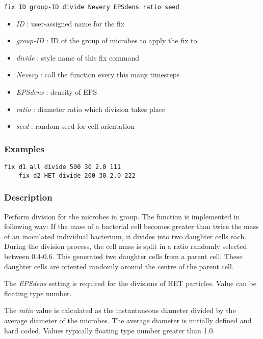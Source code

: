 \documentclass[11pt,a4paper,openright]{article}
\begin{document}
\begin{Verbatim}[frame=single]
	fix ID group-ID divide Nevery EPSdens ratio seed
\end{Verbatim}
	
\begin{itemize}
\item
	{\it ID }: user-assigned name for the fix
\item
	{\it group-ID }: ID of the group of microbes to apply the fix to
\item
	{\it divide }: style name of this fix command
\item
	{\it Nevery }: call the function every this many timesteps
\item
	{\it EPSdens }: density of EPS 
\item
	{\it ratio }: diameter ratio which division takes place
\item 
	{\it seed }: random seed for cell orientation
\end{itemize}

\subsubsection*{Examples}

\begin{Verbatim}[frame=single]
	fix d1 all divide 500 30 2.0 111
	fix d2 HET divide 200 30 2.0 222
\end{Verbatim}

\subsubsection*{Description}

Perform division for the microbes in group. 
The function is implemented in following way: If the mass of a bacterial
cell becomes greater than twice the mass of an inoculated individual bacterium, 
it divides into two daughter cells each. During the division process,
the cell mass is split in a ratio randomly selected between 0.4-0.6. This
generated two daughter cells from a parent cell. These daughter cells are
oriented randomly around the centre of the parent cell.

The {\it EPSdens} setting is required for the divisions of HET
particles. Value can be floating type number.

The {\it ratio} value is calculated as the instantaneous diameter divided by the
average diameter of the microbes. The average diameter is initially
defined and hard coded. Values typically floating type number greater than 1.0.
\end{document}
